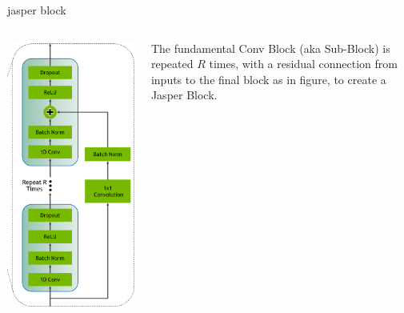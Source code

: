 \documentclass[aspectratio=169,xcolor={dvipsnames,svgnames}]{beamer}
\begin{document}
\begin{frame}[label={sec:orgab1b1fd}]{jasper block}
\begin{columns}
\begin{column}{0.25\columnwidth}
\begin{center}
\includegraphics[width=.9\linewidth]{org-download-images/Contribution/2024-09-16_23-01-42_screenshot.png}
\end{center}
\end{column}
\begin{column}{0.6\columnwidth}
The fundamental Conv Block (aka Sub-Block) is repeated
\(R\) times, with a residual connection from inputs to
the final block as in figure, to create a Jasper Block.
\end{column}
\end{columns}
\end{frame}
\end{document}
